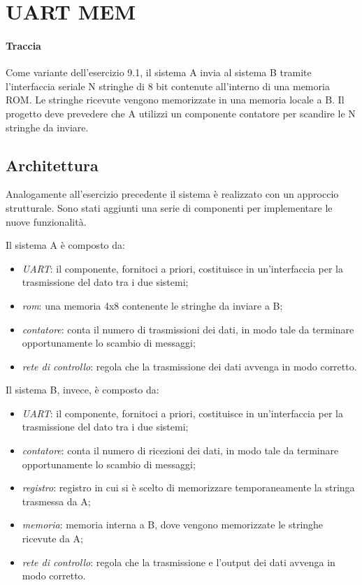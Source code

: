 \section{UART MEM}
\paragraph{Traccia} Come variante dell’esercizio 9.1, il sistema A invia al sistema B tramite l’interfaccia seriale N stringhe di 8 bit contenute all’interno di una memoria ROM. Le stringhe ricevute vengono memorizzate in una memoria locale a B. Il progetto deve prevedere che A utilizzi un componente contatore per scandire le N stringhe da inviare.

\subsection{Architettura}
Analogamente all'esercizio precedente il sistema è realizzato con un approccio strutturale. Sono stati aggiunti una serie di componenti per implementare le nuove funzionalità.

Il sistema A è composto da:
\begin{itemize}
    \item \textit{UART}: il componente, fornitoci a priori, costituisce in un'interfaccia per la trasmissione del dato tra i due sistemi;
    \item \textit{rom}: una memoria 4x8 contenente le stringhe da inviare a B;
    \item \textit{contatore}: conta il numero di trasmissioni dei dati, in modo tale da terminare opportunamente lo scambio di messaggi; 
    \item \textit{rete di controllo}: regola che la trasmissione dei dati avvenga in modo corretto.
\end{itemize}

Il sistema B, invece, è composto da:
\begin{itemize}
    \item \textit{UART}: il componente, fornitoci a priori, costituisce in un'interfaccia per la trasmissione del dato tra i due sistemi;
    \item \textit{contatore}: conta il numero di ricezioni dei dati, in modo tale da terminare opportunamente lo scambio di messaggi;
    \item \textit{registro}: registro in cui si è scelto di memorizzare temporaneamente la stringa trasmessa da A;
    \item \textit{memoria}: memoria interna a B, dove vengono memorizzate le stringhe ricevute da A;
    \item \textit{rete di controllo}: regola che la trasmissione e l'output dei dati avvenga in modo corretto.
\end{itemize}


